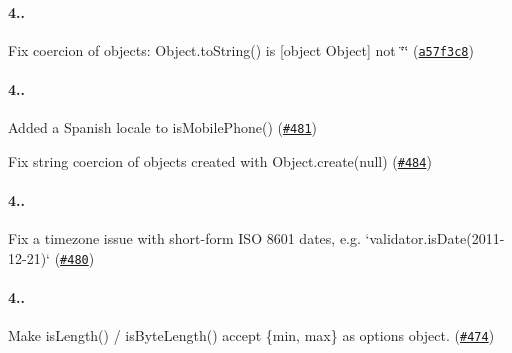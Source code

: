 \paragraph*{4..}


\begin{DoxyItemize}
\item Fix coercion of objects\+: {\ttfamily Object.\+to\+String()} is {\ttfamily \mbox{[}object Object\mbox{]}} not {\ttfamily \char`\"{}\char`\"{}} (\href{https://github.com/chriso/validator.js/commit/a57f3c843c715fba2664ee22ec80e9e28e88e0a6}{\tt a57f3c8})
\end{DoxyItemize}

\paragraph*{4..}


\begin{DoxyItemize}
\item Added a Spanish locale to {\ttfamily is\+Mobile\+Phone()} (\href{https://github.com/chriso/validator.js/pull/481}{\tt \#481})
\item Fix string coercion of objects created with {\ttfamily Object.\+create(null)} (\href{https://github.com/chriso/validator.js/issues/484}{\tt \#484})
\end{DoxyItemize}

\paragraph*{4..}


\begin{DoxyItemize}
\item Fix a timezone issue with short-\/form I\+SO 8601 dates, e.\+g. `validator.is\+Date(\textquotesingle{}2011-\/12-\/21\textquotesingle{})` (\href{https://github.com/chriso/validator.js/issues/480}{\tt \#480})
\end{DoxyItemize}

\paragraph*{4..}


\begin{DoxyItemize}
\item Make {\ttfamily is\+Length()} / {\ttfamily is\+Byte\+Length()} accept {\ttfamily \{min, max\}} as options object. (\href{https://github.com/chriso/validator.js/issues/474}{\tt \#474})
\end{DoxyItemize}

